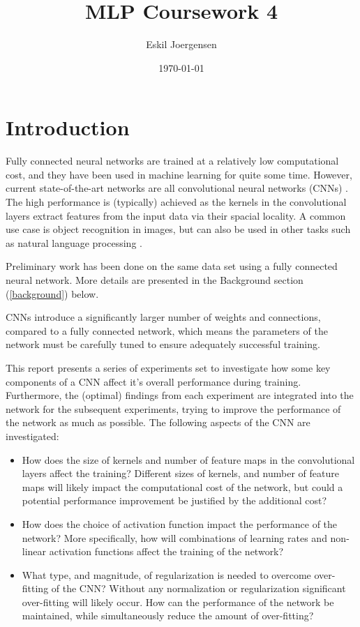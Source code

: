\documentclass[]{article}
\title{MLP Coursework 4}
\author{Eskil Joergensen}
\date{\today}
\begin{document}
\maketitle

\section{Introduction}

Fully connected neural networks are trained at a relatively low computational cost, and they have been used in machine learning for quite some time. However, current state-of-the-art networks are all convolutional neural networks (CNNs) \cite{long2015fully}. The high performance is (typically) achieved as the kernels in the convolutional layers extract features from the input data via their spacial locality. A common use case is object recognition in images, but can also be used in other tasks such as natural language processing \cite{Collobert}. 

Preliminary work has been done on the same data set using a fully connected neural network. More details are presented in the Background section (\ref{background}) below. 

CNNs introduce a significantly larger number of weights and connections, compared to a fully connected network, which means the parameters of the network must be carefully tuned to ensure adequately successful training. 

This report presents a series of experiments set to investigate how some key components of a CNN affect it's overall performance during training. Furthermore, the (optimal) findings from each experiment are integrated into the network for the subsequent experiments, trying to improve the performance of the network as much as possible. The following aspects of the CNN are investigated:

\begin{itemize}
	
	\item How does the size of kernels and number of feature maps in the convolutional layers affect the training? Different sizes of kernels, and number of feature maps will likely impact the computational cost of the network, but could a potential performance improvement be justified by the additional cost?
	
	\item How does the choice of activation function impact the performance of the network? More specifically, how will combinations of learning rates and non-linear activation functions affect the training of the network? 
	
	\item What type, and magnitude, of regularization is needed to overcome over-fitting of the CNN? Without any normalization or regularization significant over-fitting will likely occur. How can the performance of the network be maintained, while simultaneously reduce the amount of over-fitting?
	
\end{itemize}
\end{document}
